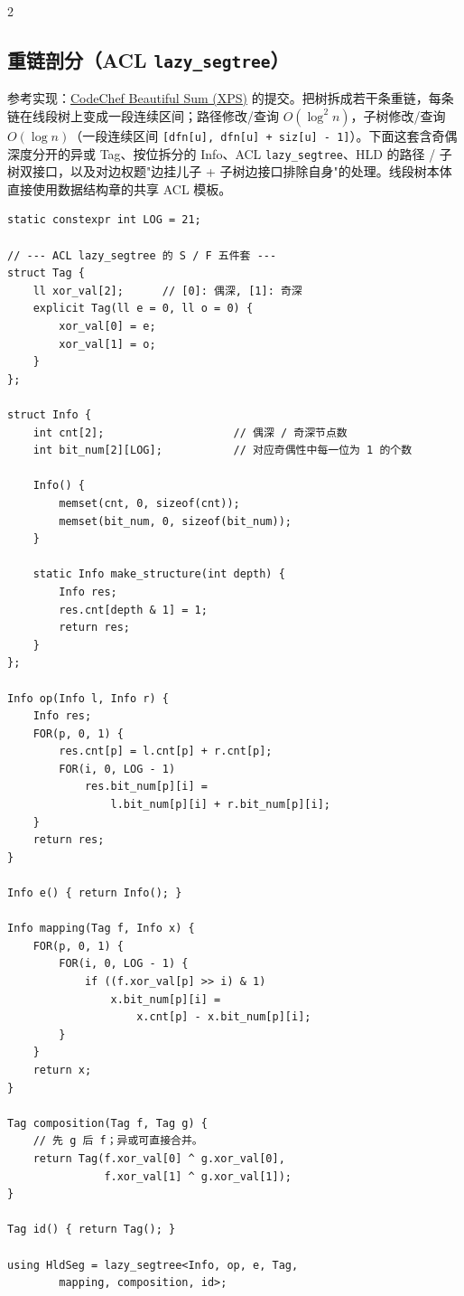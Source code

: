 \begin{multicols*}{2}
		\subsection{重链剖分（ACL \texttt{lazy\_segtree}）}

		参考实现：\href{https://www.codechef.com/viewsolution/1209757778}{CodeChef Beautiful Sum (XPS)} 的提交。把树拆成若干条重链，每条链在线段树上变成一段连续区间；路径修改/查询 $O(\log^2 n)$，子树修改/查询 $O(\log n)$（一段连续区间 \texttt{[dfn[u], dfn[u] + siz[u] - 1]}）。下面这套含奇偶深度分开的异或 Tag、按位拆分的 Info、ACL \texttt{lazy\_segtree}、HLD 的路径 / 子树双接口，以及对边权题"边挂儿子 + 子树边接口排除自身"的处理。线段树本体直接使用数据结构章的共享 ACL 模板。

		\begin{verbatim}
static constexpr int LOG = 21;

// --- ACL lazy_segtree 的 S / F 五件套 ---
struct Tag {
    ll xor_val[2];      // [0]: 偶深, [1]: 奇深
    explicit Tag(ll e = 0, ll o = 0) {
        xor_val[0] = e;
        xor_val[1] = o;
    }
};

struct Info {
    int cnt[2];                    // 偶深 / 奇深节点数
    int bit_num[2][LOG];           // 对应奇偶性中每一位为 1 的个数

    Info() {
        memset(cnt, 0, sizeof(cnt));
        memset(bit_num, 0, sizeof(bit_num));
    }

    static Info make_structure(int depth) {
        Info res;
        res.cnt[depth & 1] = 1;
        return res;
    }
};

Info op(Info l, Info r) {
    Info res;
    FOR(p, 0, 1) {
        res.cnt[p] = l.cnt[p] + r.cnt[p];
        FOR(i, 0, LOG - 1)
            res.bit_num[p][i] =
                l.bit_num[p][i] + r.bit_num[p][i];
    }
    return res;
}

Info e() { return Info(); }

Info mapping(Tag f, Info x) {
    FOR(p, 0, 1) {
        FOR(i, 0, LOG - 1) {
            if ((f.xor_val[p] >> i) & 1)
                x.bit_num[p][i] =
                    x.cnt[p] - x.bit_num[p][i];
        }
    }
    return x;
}

Tag composition(Tag f, Tag g) {
    // 先 g 后 f；异或可直接合并。
    return Tag(f.xor_val[0] ^ g.xor_val[0],
               f.xor_val[1] ^ g.xor_val[1]);
}

Tag id() { return Tag(); }

using HldSeg = lazy_segtree<Info, op, e, Tag,
        mapping, composition, id>;


\end{verbatim}
\end{multicols*}
